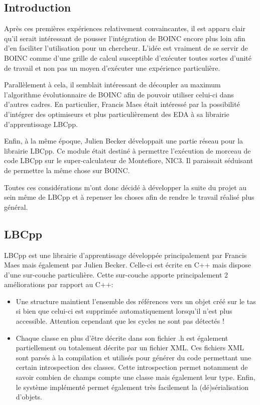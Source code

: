 \documentclass[a4paper, 11pt]{article}
\begin{document}
\subsection{Introduction}
Après ces premières expériences relativement convaincantes, il est apparu clair qu'il serait intéressant de pousser l'intégration de \textsc{BOINC} encore plus loin afin d'en faciliter l'utilisation pour un chercheur. L'idée est vraiment de se servir de \textsc{BOINC} comme d'une grille de calcul susceptible d'exécuter toutes sortes d'unité de travail et non pas un moyen d'exécuter une expérience particulière.

Parallèlement à cela, il semblait intéressant de découpler au maximum l'algorithme évolutionnaire de \textsc{BOINC} afin de pouvoir utiliser celui-ci dans d'autres cadres. En particulier, Francis Maes était intéressé par la possibilité d'intégrer des optimiseurs et plus particulièrement des EDA à sa librairie d'apprentissage LBCpp.

Enfin, à la même époque, Julien Becker développait une partie réseau pour la librairie LBCpp. Ce module était destiné à permettre l'exécution de morceau de code LBCpp sur le super-calculateur de Montefiore, NIC3. Il paraissait séduisant de permettre la même chose sur \textsc{BOINC}.

Toutes ces considérations m'ont donc décidé à développer la suite du projet au sein même de LBCpp et à repenser les choses afin de rendre le travail réalisé plus général.

\subsection{LBCpp}
LBCpp est une librairie d'apprentissage développée principalement par Francis Maes mais également par Julien Becker. Celle-ci est écrite en C++ mais dispose d'une sur-couche particulière. Cette sur-couche apporte principalement 2 améliorations par rapport au C++:
\begin{itemize}
\item Une structure maintient l'ensemble des références vers un objet créé sur le tas si bien que celui-ci est supprimée automatiquement lorsqu'il n'est plus accessible. Attention cependant que les cycles ne sont pas détectés !
\item Chaque classe en plus d'être décrite dans son fichier .h est également partiellement ou totalement décrite par un fichier XML. Ces fichiers XML sont parsés à la compilation et utilisés pour générer du code permettant une certain introspection des classes. Cette introspection permet notamment de savoir combien de champs compte une classe mais également leur type. Enfin, le système implémenté permet également très facilement la (dé)sérialisation d'objets.
\end{itemize}
\end{document}
